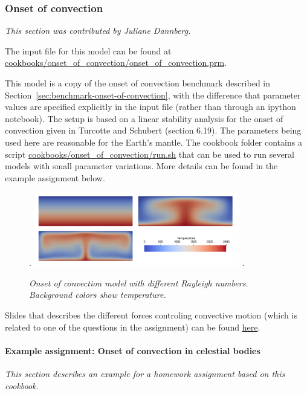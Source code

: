 \subsubsection{Onset of convection}
\label{sec:cookbooks-onset-of-convection}
\textit{This section was contributed by Juliane Dannberg.}

The input file for this model can be found at \url{cookbooks/onset_of_convection/onset_of_convection.prm}.

This model is a  copy of the onset of convection benchmark described in Section~\ref{sec:benchmark-onset-of-convection}, 
with the difference that parameter values are specified explicitly in the input file (rather than through an ipython notebook). 
The setup is based on a linear stability analysis for the onset of convection given in Turcotte and Schubert \cite{TS14} (section 6.19).
The parameters being used here are reasonable for the Earth's mantle. The cookbook folder contains a script 
\url{cookbooks/onset_of_convection/run.sh} that can be used to run several models with small parameter variations.
More details can be found in the example assignment below. 

\begin{figure}[h]
\phantom.
\hfill
\includegraphics[width=0.8\textwidth]{cookbooks/onset_of_convection/doc/convection_models.png}
\hfill
\phantom.
\caption{\it Onset of convection model with different Rayleigh numbers. Background colors show temperature.}
\label{fig:convection-box-iterations}
\end{figure}

Slides that describes the different forces controling convective motion (which is related to one of the questions
in the assignment) can be found \href{https://www.dropbox.com/s/0wqtg05w7713hdz/06_geophysics_lecture_01_29.pdf?dl=0}{here}.

\paragraph{Example assignment: Onset of convection in celestial bodies}
\textit{This section describes an example for a homework assignment based on this cookbook.}

